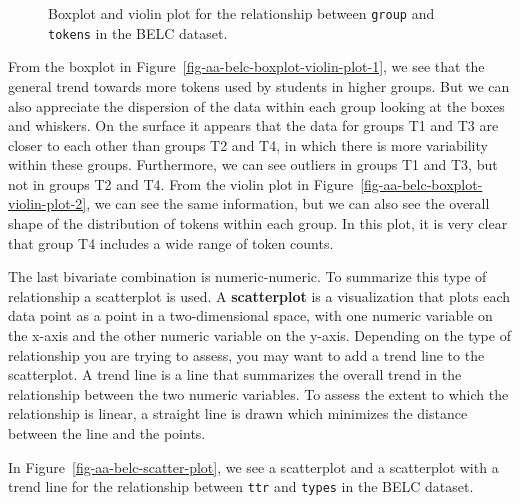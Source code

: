 \documentclass[
  letterpaper,
]{latex/krantz}
\theoremstyle{definition}
\theoremstyle{remark}
\begin{document}
\begin{figure}[H]
\begin{minipage}{0.50\linewidth}
{}


\end{minipage}%

\caption{\label{fig-aa-belc-boxplot-violin-plot}Boxplot and violin plot
for the relationship between \texttt{group} and \texttt{tokens} in the
BELC dataset.}

\end{figure}%

From the boxplot in Figure~\ref{fig-aa-belc-boxplot-violin-plot-1}, we
see that the general trend towards more tokens used by students in
higher groups. But we can also appreciate the dispersion of the data
within each group looking at the boxes and whiskers. On the surface it
appears that the data for groups T1 and T3 are closer to each other than
groups T2 and T4, in which there is more variability within these
groups. Furthermore, we can see outliers in groups T1 and T3, but not in
groups T2 and T4. From the violin plot in
Figure~\ref{fig-aa-belc-boxplot-violin-plot-2}, we can see the same
information, but we can also see the overall shape of the distribution
of tokens within each group. In this plot, it is very clear that group
T4 includes a wide range of token counts.

The last bivariate combination is numeric-numeric. To summarize this
type of relationship a scatterplot is used. A \textbf{scatterplot} is a
visualization that plots each data point as a point in a two-dimensional
space, with one numeric variable on the x-axis and the other numeric
variable on the y-axis. Depending on the type of relationship you are
trying to assess, you may want to add a trend line to the scatterplot. A
trend line is a line that summarizes the overall trend in the
relationship between the two numeric variables. To assess the extent to
which the relationship is linear, a straight line is drawn which
minimizes the distance between the line and the points.

In Figure~\ref{fig-aa-belc-scatter-plot}, we see a scatterplot and a
scatterplot with a trend line for the relationship between \texttt{ttr}
and \texttt{types} in the BELC dataset.
\end{document}
